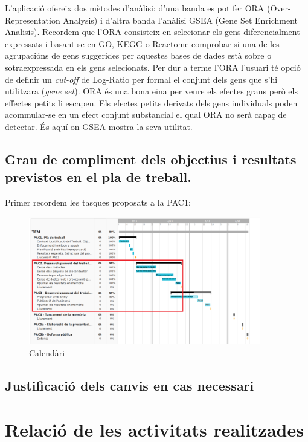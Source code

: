 \documentclass[]{article}
\begin{document}
L'aplicació ofereix dos mètodes d'anàlisi: d'una banda es pot  fer ORA (Over-Representation Analysis) i d'altra banda l'anàlisi GSEA (Gene Set Enrichment Analisis). Recordem que l'ORA consisteix en selecionar els gens diferencialment expressats i basant-se en GO, KEGG o Reactome comprobar si una de les agrupacións de gens suggerides per aquestes bases de dades està sobre o sotraexpressada en els gens selecionats. Per dur a terme l'ORA l'usuari té opció de definir un \textit{cut-off} de Log-Ratio per formal el conjunt dels gens que s'hi utilitzara (\textit{gene set}). ORA és una bona eina per veure els efectes grans però els effectes petits li escapen.  Els efectes petits derivats dels gens individuals poden acommular-se en un efect conjunt substancial el qual ORA no serà capaç de detectar. És aquí on GSEA mostra la seva utilitat. 

     \subsection{Grau de compliment dels objectius i resultats previstos en el pla de treball.}

Primer recordem les tasques proposats a la PAC1:

\begin{figure}[h!]
\caption{Calendàri}
\centering
\includegraphics[width=0.9\textwidth]{Calender}
\end{figure}

     \subsection{Justificació dels canvis en cas necessari}

   \section{Relació de les activitats realitzades}
\end{document}
